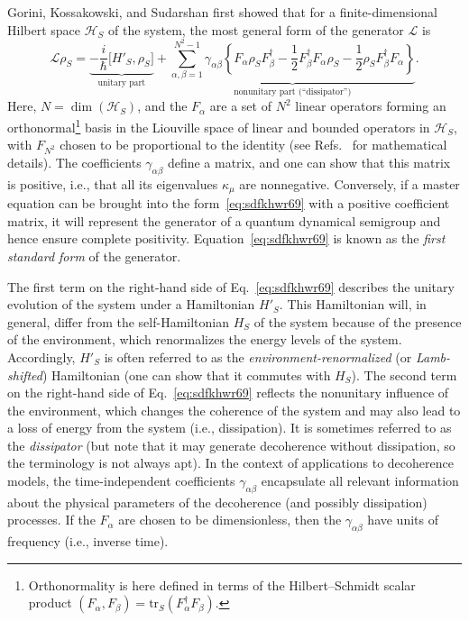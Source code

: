\documentclass[3p,sort&compress,12pt]{elsarticle}
\newcommand{\I}{\ensuremath{i}}
\newcommand{\op}[1]{#1}
\begin{document}
Gorini, Kossakowski, and Sudarshan \cite{Gorini:1976:tt} first showed that for a finite-dimensional Hilbert space $\mathcal{H}_S$ of the system, the most general form of the generator $\mathcal{L}$ is \cite{Breuer:2002:oq,Alicki:2007:uu}
%
\begin{equation}
  \label{eq:sdfkhwr69}
\mathcal{L}\op{\rho}_S = \underbrace{-\frac{\I}{\hbar} \bigl[
  \op{H}'_S, \op{\rho}_S \bigr]}_{\text{unitary part}} + \underbrace{\sum_{\alpha,\beta=1}^{N^2-1} \gamma_{\alpha\beta} \left\{
\op{F}_\alpha \op{\rho}_S \op{F}^\dagger_\beta - \frac{1}{2} \op{F}^\dagger_\beta\op{F}_\alpha \op{\rho}_S
- \frac{1}{2} \op{\rho}_S\op{F}^\dagger_\beta\op{F}_\alpha \right\}}_{\text{nonunitary part (``dissipator'')}}.
\end{equation}
%
Here, $N=\dim(\mathcal{H}_S)$, and the $\op{F}_\alpha$ are a set of $N^2$ linear operators forming an orthonormal\footnote{Orthonormality is here defined in terms of the Hilbert--Schmidt scalar product $(\op{F}_\alpha, \op{F}_\beta) = \text{tr}_S (\op{F}_\alpha^\dagger \op{F}_\beta)$.}  basis in the Liouville space of linear and bounded operators in $\mathcal{H}_S$, with $\op{F}_{N^2}$ chosen to be proportional to the identity (see Refs.~\cite{Breuer:2002:oq,Alicki:2007:uu} for mathematical details). The coefficients $\gamma_{\alpha\beta}$ define a matrix, and one can show that this matrix is positive, i.e., that all its eigenvalues $\kappa_\mu$ are nonnegative. Conversely, if a master equation can be brought into the form~\eqref{eq:sdfkhwr69} with a positive coefficient matrix, it will represent the generator of a quantum dynamical semigroup and hence ensure complete positivity. Equation~\eqref{eq:sdfkhwr69} is known as the \emph{first standard form} of the generator. 

The first term on the right-hand side of Eq.~\eqref{eq:sdfkhwr69} describes the unitary evolution of the system under a Hamiltonian $\op{H}'_S$. This Hamiltonian will, in general, differ from the self-Hamiltonian $\op{H}_S$ of the system because of the presence of the environment, which renormalizes the energy levels of the system. Accordingly, $\op{H}'_S$ is often referred to as the \emph{environment-renormalized} (or \emph{Lamb-shifted}) Hamiltonian (one can show that it commutes with $\op{H}_S$).  The second term on the right-hand side of Eq.~\eqref{eq:sdfkhwr69} reflects the nonunitary influence of the environment, which changes the coherence of the system and may also lead to a loss of energy from the system (i.e., dissipation). It is sometimes referred to as the \emph{dissipator} \cite{Breuer:2002:oq} (but note that it may generate decoherence without dissipation, so the terminology is not always apt). In the context of applications to decoherence models, the time-independent coefficients $\gamma_{\alpha\beta}$ encapsulate all relevant information about the physical parameters of the decoherence (and possibly dissipation) processes. If the $\op{F}_\alpha$ are chosen to be dimensionless, then the $\gamma_{\alpha\beta}$ have units of frequency (i.e., inverse time).
\end{document}
